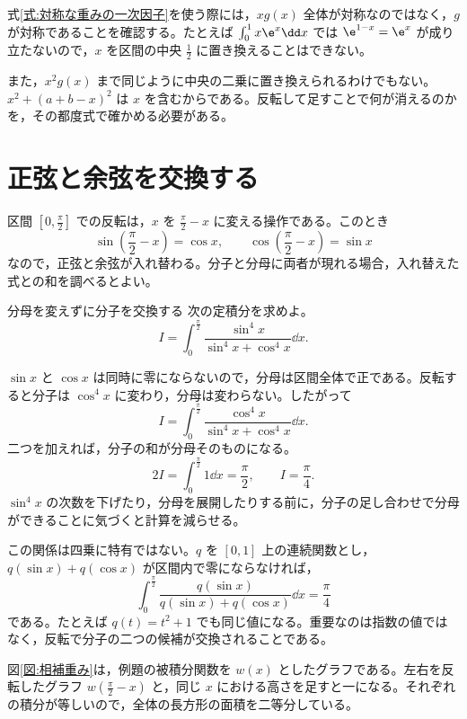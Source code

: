 式\eqref{式:対称な重みの一次因子}を使う際には，$xg(x)$ 全体が対称なのではなく，$g$ が対称であることを確認する。たとえば $\int_0^1 x\e^x\dd x$ では $\e^{1-x}=\e^x$ が成り立たないので，$x$ を区間の中央 $\frac12$ に置き換えることはできない。

また，$x^2g(x)$ まで同じように中央の二乗に置き換えられるわけでもない。$x^2+(a+b-x)^2$ は $x$ を含むからである。反転して足すことで何が消えるのかを，その都度式で確かめる必要がある。

\section{正弦と余弦を交換する}\label{節:正弦余弦の交換}

区間 $\left[0,\frac{\pi}{2}\right]$ での反転は，$x$ を $\frac{\pi}{2}-x$ に変える操作である。このとき
\[
\sin\left(\frac{\pi}{2}-x\right)=\cos x,\qquad
\cos\left(\frac{\pi}{2}-x\right)=\sin x
\]
なので，正弦と余弦が入れ替わる。分子と分母に両者が現れる場合，入れ替えた式との和を調べるとよい。

\begin{example}{分母を変えずに分子を交換する}
次の定積分を求めよ。
\[
I=\int_0^{\frac{\pi}{2}}
\frac{\sin^4x}{\sin^4x+\cos^4x}\dd x.
\]
\end{example}

$\sin x$ と $\cos x$ は同時に零にならないので，分母は区間全体で正である。反転すると分子は $\cos^4x$ に変わり，分母は変わらない。したがって
\[
I=\int_0^{\frac{\pi}{2}}
\frac{\cos^4x}{\sin^4x+\cos^4x}\dd x.
\]
二つを加えれば，分子の和が分母そのものになる。
\[
2I=\int_0^{\frac{\pi}{2}}1\dd x=\frac{\pi}{2},
\qquad I=\frac{\pi}{4}.
\]
$\sin^4x$ の次数を下げたり，分母を展開したりする前に，分子の足し合わせで分母ができることに気づくと計算を減らせる。

この関係は四乗に特有ではない。$q$ を $[0,1]$ 上の連続関数とし，$q(\sin x)+q(\cos x)$ が区間内で零にならなければ，
\[
\int_0^{\frac{\pi}{2}}
\frac{q(\sin x)}{q(\sin x)+q(\cos x)}\dd x
 =\frac{\pi}{4}
\]
である。たとえば $q(t)=t^2+1$ でも同じ値になる。重要なのは指数の値ではなく，反転で分子の二つの候補が交換されることである。

図\ref{図:相補重み}は，例題の被積分関数を $w(x)$ としたグラフである。左右を反転したグラフ $w(\frac{\pi}{2}-x)$ と，同じ $x$ における高さを足すと一になる。それぞれの積分が等しいので，全体の長方形の面積を二等分している。

